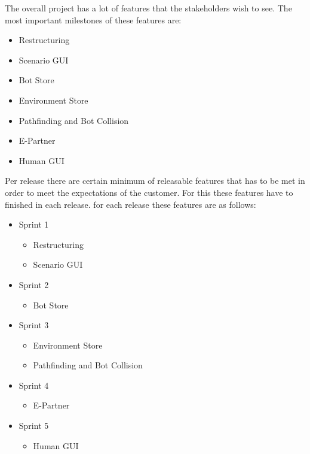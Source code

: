 \begin{description}
\item{}
The overall project has a lot of features that the stakeholders wish to see. The most important milestones of these features are:
\begin{itemize}
	\item Restructuring
	\item Scenario GUI
	\item Bot Store
	\item Environment Store
	\item Pathfinding and Bot Collision
	\item E-Partner
	\item Human GUI
\end{itemize}

Per release there are certain minimum of releasable features that has to be met in order to meet the expectations of the customer. For this these features have to finished in each release. for each release these features are as follows:
\begin{itemize}
	\item Sprint 1
	\begin{itemize}
		\item Restructuring
		\item Scenario GUI
	\end{itemize}
	\item Sprint 2
	\begin{itemize}
		\item Bot Store
	\end{itemize}
	\item Sprint 3
	\begin{itemize}
		\item Environment Store
		\item Pathfinding and Bot Collision
	\end{itemize}
	\item Sprint 4
	\begin{itemize}
		\item E-Partner
	\end{itemize}
	\item Sprint 5
	\begin{itemize}
		\item Human GUI
	\end{itemize}
\end{itemize}


\end{description}
